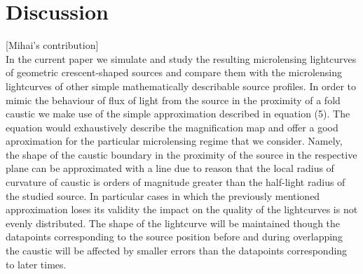 \section{Discussion}
[Mihai's contribution]\\
In the current paper we simulate and study the resulting microlensing lightcurves of geometric crescent-shaped sources and compare them with the microlensing lightcurves of other simple mathematically describable source profiles. 
In order to mimic the behaviour of flux of light from the source in the proximity of a fold caustic we make use of the simple approximation described in equation (5). The equation would exhaustively describe the magnification map and offer a good aproximation for the particular microlensing regime that we consider. 
Namely, the shape of the caustic boundary in the proximity of the source in the respective plane can be approximated with a line due to reason that the local radius of curvature of caustic is orders of magnitude greater than the half-light radius of the studied source. 
In particular cases in which the previously mentioned approximation loses its validity the impact on the quality of the lightcurves is not evenly distributed. The shape of the lightcurve will be maintained though the datapoints corresponding to the source position before and during overlapping the caustic will be affected by smaller errors than the datapoints corresponding to later times. \\


